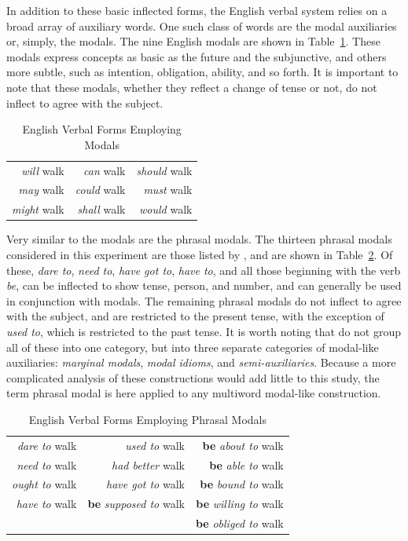 \documentclass[main.tex]{subfiles}
\begin{document}
In addition to these basic inflected forms, the English verbal system relies on a broad array of auxiliary words. One such class of words are the modal auxiliaries or, simply, the modals. The nine English modals are shown in Table~\ref{table:modal-verbs}. These modals express concepts as basic as the future and the subjunctive, and others more subtle, such as intention, obligation, ability, and so forth. It is important to note that these modals, whether they reflect a change of tense or not, do not inflect to agree with the subject. 

\begin{table}[htbp]
\small
\centering
\caption{English Verbal Forms Employing Modals}
\begin{tabular}{ r r r }
\toprule
\textit{will} walk & \textit{can} walk & \textit{should} walk \\
\textit{may} walk & \textit{could} walk & \textit{must} walk \\
\textit{might} walk & \textit{shall} walk & \textit{would} walk\\
\bottomrule
\end{tabular}
\label{table:modal-verbs}
\end{table}

Very similar to the modals are the phrasal modals. The thirteen phrasal modals considered in this experiment are those listed by \citet[Ch. 3]{quirk:1985}, and are shown in Table~\ref{table:quasimodal-verbs}. Of these, \textit{dare to}, \textit{need to}, \textit{have got to}, \textit{have to}, and all those beginning with the verb \textit{be}, can be inflected to show tense, person, and number, and can generally be used in conjunction with modals. The remaining phrasal modals do not inflect to agree with the subject, and are restricted to the present tense, with the exception of \textit{used to}, which is restricted to the past tense. It is worth noting that \citet{quirk:1985} do not group all of these into one category, but into three separate categories of modal-like auxiliaries: \textit{marginal modals}, \textit{modal idioms}, and \textit{semi-auxiliaries}. Because a more complicated analysis of these constructions would add little to this study, the term phrasal modal is here applied to any multiword modal-like construction.

\begin{table}[htbp]
\small
\centering
\caption{English Verbal Forms Employing Phrasal Modals}
\begin{tabular}{ r r r }
\toprule
\textit{dare to} walk & \textit{used to} walk & \textbf{be} \textit{about to} walk \\
\textit{need to} walk & \textit{had better} walk & \textbf{be} \textit{able to} walk \\
\textit{ought to} walk & \textit{have got to} walk & \textbf{be} \textit{bound to} walk \\
\textit{have to} walk & \textbf{be} \textit{supposed to} walk & \textbf{be} \textit{willing to} walk\\
&&\textbf{be} \textit{obliged to} walk\\
\bottomrule
\end{tabular}
\label{table:quasimodal-verbs}
\end{table}
\end{document}
